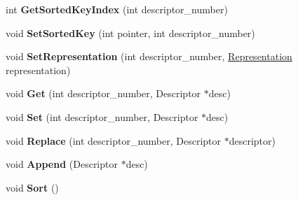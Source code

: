 \begin{DoxyCompactItemize}
\item 
\hypertarget{classv8_1_1internal_1_1_descriptor_array_a36c2656a9bf52ef6bb516cfd1ab79cb7}{}int {\bfseries Get\+Sorted\+Key\+Index} (int descriptor\+\_\+number)\label{classv8_1_1internal_1_1_descriptor_array_a36c2656a9bf52ef6bb516cfd1ab79cb7}

\item 
\hypertarget{classv8_1_1internal_1_1_descriptor_array_a621c6edb83af3d30bccefbfee213df39}{}void {\bfseries Set\+Sorted\+Key} (int pointer, int descriptor\+\_\+number)\label{classv8_1_1internal_1_1_descriptor_array_a621c6edb83af3d30bccefbfee213df39}

\item 
\hypertarget{classv8_1_1internal_1_1_descriptor_array_a3a00920b2822302d03addd2bc48536a1}{}void {\bfseries Set\+Representation} (int descriptor\+\_\+number, \hyperlink{classv8_1_1internal_1_1_representation}{Representation} representation)\label{classv8_1_1internal_1_1_descriptor_array_a3a00920b2822302d03addd2bc48536a1}

\item 
\hypertarget{classv8_1_1internal_1_1_descriptor_array_a7e737fcd90f03235f423623c9fdf1ce7}{}void {\bfseries Get} (int descriptor\+\_\+number, Descriptor $\ast$desc)\label{classv8_1_1internal_1_1_descriptor_array_a7e737fcd90f03235f423623c9fdf1ce7}

\item 
\hypertarget{classv8_1_1internal_1_1_descriptor_array_a950665afb85bdb2fb375e0ea684fc2e2}{}void {\bfseries Set} (int descriptor\+\_\+number, Descriptor $\ast$desc)\label{classv8_1_1internal_1_1_descriptor_array_a950665afb85bdb2fb375e0ea684fc2e2}

\item 
\hypertarget{classv8_1_1internal_1_1_descriptor_array_a077c7152dd11617df87f9b272b70a97c}{}void {\bfseries Replace} (int descriptor\+\_\+number, Descriptor $\ast$descriptor)\label{classv8_1_1internal_1_1_descriptor_array_a077c7152dd11617df87f9b272b70a97c}

\item 
\hypertarget{classv8_1_1internal_1_1_descriptor_array_aca6d89b775bf9bf687ba9a654521eb49}{}void {\bfseries Append} (Descriptor $\ast$desc)\label{classv8_1_1internal_1_1_descriptor_array_aca6d89b775bf9bf687ba9a654521eb49}

\item 
\hypertarget{classv8_1_1internal_1_1_descriptor_array_a5ef83bcfde45529ee36e444ed17e4dde}{}void {\bfseries Sort} ()\label{classv8_1_1internal_1_1_descriptor_array_a5ef83bcfde45529ee36e444ed17e4dde}


\end{DoxyCompactItemize}
